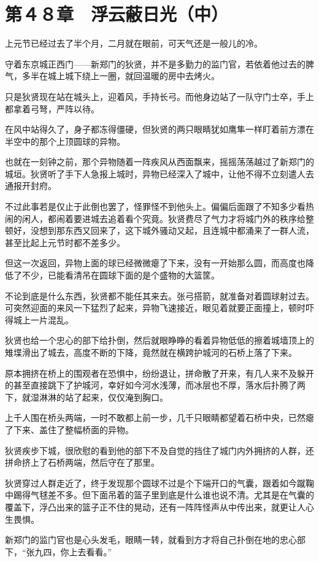 \section{第４８章　浮云蔽日光（中）}

上元节已经过去了半个月，二月就在眼前，可天气还是一般儿的冷。

守着东京城正西门——新郑门的狄贤，并不是多勤力的监门官，若依着他过去的脾气，多半在城上城下绕上一圈，就回温暖的房中去烤火。

只是狄贤现在站在城头上，迎着风，手持长弓。而他身边站了一队守门士卒，手上都拿着弓弩，严阵以待。

在风中站得久了，身子都冻得僵硬，但狄贤的两只眼睛犹如鹰隼一样盯着前方漂在半空中的那个上顶圆球的异物。

也就在一刻钟之前，那个异物随着一阵疾风从西面飘来，摇摇荡荡越过了新郑门的城垣。狄贤听了手下人急报上城时，异物已经深入了城中，让他不得不立刻遣人去通报开封府。

不过此事若是仅止于此倒也罢了，怪罪怪不到他头上。偏偏后面跟了不知多少看热闹的闲人，都闹着要进城去追着看个究竟。狄贤费尽了气力才将城门外的秩序给整顿好，没想到那东西又回来了，这下城外骚动又起，且连城中都涌来了一群人流，甚至比起上元节时都不差多少。

但这一次返回，异物上面的球已经微微瘪了下来，没有一开始那么圆，而高度也降低了不少，已能看清吊在圆球下面的是个盛物的大篮筐。

不论到底是什么东西，狄贤都不能任其来去。张弓搭箭，就准备对着圆球射过去。可突然迎面的来风一下猛烈了起来，异物飞速接近，眼见着就要正面撞上，顿时吓得城上一片混乱。

狄贤也给一个忠心的部下给扑倒，然后就眼睁睁的看着异物低低的擦着城墙顶上的雉堞滑出了城去，高度不断的下降，竟然就在横跨护城河的石桥上落了下来。

原本拥挤在桥上的围观者在恐惧中，纷纷退让，拼命散了开来，有几人来不及躲开的甚至直接跳下了护城河，幸好如今河水浅薄，而冰层也不厚，落水后扑腾了两下，就湿淋淋的站了起来，仅仅淹到胸口。

上千人围在桥头两端，一时不敢都上前一步，几千只眼睛都望着石桥中央，已然瘪了下来、盖住了整幅桥面的异物。

狄贤疾步下城，很欣慰的看到他的部下不及自觉的挡住了城门内外拥挤的人群，还拼命挤上了石桥两端，然后守在了那里。

狄贤穿过人群走近了，终于发现那个圆球不过是个下端开口的气囊，跟着如今蹴鞠中踢得气毬差不多。但下面吊着的篮子里到底是什么谁也说不清。尤其是在气囊的覆盖下，浮凸出来的篮子正不住的晃动，还有一阵阵怪声从中传出来，就更让人心生畏惧。

新郑门的监门官也是心头发毛，眼睛一转，就看到方才将自己扑倒在地的忠心部下，“张九四，你上去看看。”


